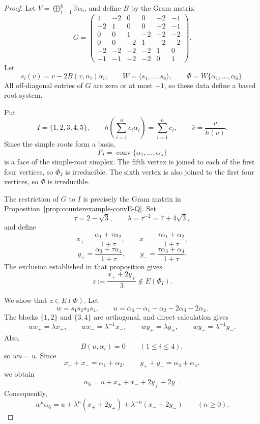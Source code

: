 \documentclass[11pt,reqno]{amsart}
\theoremstyle{plain}
\theoremstyle{definition}
\theoremstyle{remark}
\numberwithin{equation}{section}
\begin{document}
\begin{proof}
Let $V=\bigoplus_{i=1}^{6}\mathbb R\alpha_i$, and define $B$
by the Gram matrix
\[
G=
\begin{pmatrix}
1&-2&0&0&-2&-1\\
-2&1&0&0&-2&-1\\
0&0&1&-2&-2&-2\\
0&0&-2&1&-2&-2\\
-2&-2&-2&-2&1&0\\
-1&-1&-2&-2&0&1
\end{pmatrix}.
\]
Let
\[
s_i(v)=v-2B(v,\alpha_i)\alpha_i,
\qquad
W=\langle s_1,\ldots,s_6\rangle,
\qquad
\Phi=W\{\alpha_1,\ldots,\alpha_6\}.
\]
All off-diagonal entries of $G$ are zero or at most $-1$,
so these data define a based root system.

Put
\[
I=\{1,2,3,4,5\},
\qquad
h\left(\sum_{i=1}^{6}c_i\alpha_i\right)=\sum_{i=1}^{6}c_i,
\qquad
\widehat v=\frac{v}{h(v)}.
\]
Since the simple roots form a basis,
\[
F_I=\operatorname{conv}\{\alpha_1,\ldots,\alpha_5\}
\]
is a face of the simple-root simplex.
The fifth vertex is joined to each of the first four vertices,
so $\Phi_I$ is irreducible. The sixth vertex is also joined to
the first four vertices, so $\Phi$ is irreducible.

The restriction of $G$ to $I$ is precisely the Gram matrix in
Proposition~\ref{prop:counterexample-convE-Q}.
Set
\[
\tau=2-\sqrt3,
\qquad
\lambda=\tau^{-2}=7+4\sqrt3,
\]
and define
\[
x_+=\frac{\alpha_1+\tau\alpha_2}{1+\tau},
\qquad
x_-=\frac{\tau\alpha_1+\alpha_2}{1+\tau},
\]
\[
y_+=\frac{\alpha_3+\tau\alpha_4}{1+\tau},
\qquad
y_-=\frac{\tau\alpha_3+\alpha_4}{1+\tau}.
\]
The exclusion established in that proposition gives
\begin{equation}\label{eq:facial-excluded-point}
z:=\frac{x_++2y_+}{3}\notin E(\Phi_I).
\end{equation}

We show that $z\in E(\Phi)$.
Let
\[
w=s_1s_2s_3s_4,
\qquad
u=\alpha_6-\alpha_1-\alpha_2-2\alpha_3-2\alpha_4.
\]
The blocks $\{1,2\}$ and $\{3,4\}$ are orthogonal, and direct
calculation gives
\[
wx_+=\lambda x_+,
\qquad
wx_-=\lambda^{-1}x_-,
\qquad
wy_+=\lambda y_+,
\qquad
wy_-=\lambda^{-1}y_-.
\]
Also,
\[
B(u,\alpha_i)=0
\qquad(1\le i\le4),
\]
so $wu=u$. Since
\[
x_++x_-=\alpha_1+\alpha_2,
\qquad
y_++y_-=\alpha_3+\alpha_4,
\]
we obtain
\[
\alpha_6=u+x_++x_-+2y_++2y_-.
\]
Consequently,
\begin{equation}\label{eq:facial-root-iterate}
w^n\alpha_6
=
u+\lambda^n(x_++2y_+)
+\lambda^{-n}(x_-+2y_-)
\qquad(n\ge0).
\end{equation}


\end{proof}
\end{document}

